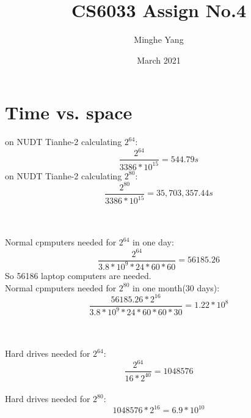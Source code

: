 \documentclass{article}
\title{CS6033 Assign No.4}
\author{Minghe Yang}
\date{March 2021}
\begin{document}
\renewcommand{\algorithmicrequire}{\textbf{Input:}} 
\renewcommand{\algorithmicensure}{\textbf{Output:}}
\maketitle

\section{Time vs. space}
on NUDT Tianhe-2 calculating $2^{64}$:
\begin{equation} 
    \frac{2^{64}}{3386*10^{15}}=544.79 s
\end{equation}
on NUDT Tianhe-2 calculating $2^{80}$:
\begin{equation} 
    \frac{2^{80}}{3386*10^{15}}=35,703,357.44 s
\end{equation}
\\\\
Normal cpmputers needed for $2^{64}$ in one day:
\begin{equation} 
    \frac{2^{64}}{3.8*10^9*24*60*60}=56185.26
\end{equation}
So 56186 laptop computers are needed.
\\Normal cpmputers needed for $2^{80}$ in one month(30 days):
\begin{equation} 
    \frac{56185.26*2^{16}}{3.8*10^9*24*60*60*30}=1.22*10^8
\end{equation}
\\\\
Hard drives needed for $2^{64}$:
\begin{equation} 
    \frac{2^{64}}{16*2^{40}}=1048576
\end{equation}
\\
Hard drives needed for $2^{80}$:
\begin{equation} 
    1048576*2^{16} = 6.9*10^{10}
\end{equation}
\\\\
\end{document}
